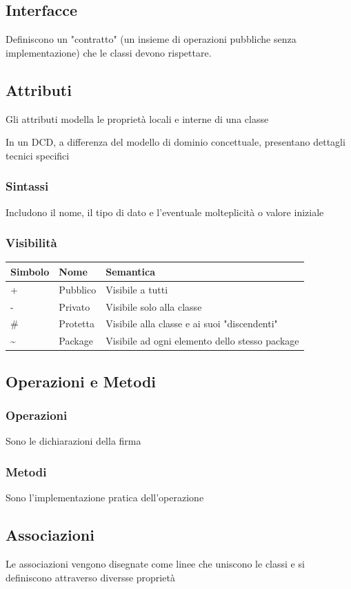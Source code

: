 \subsection{Interfacce}
Definiscono un "contratto" (un insieme di operazioni pubbliche senza implementazione) che le classi devono rispettare.
\subsection{Attributi}
Gli attributi modella le proprietà locali e interne di una classe

In un DCD, a differenza del modello di dominio concettuale, presentano dettagli tecnici specifici
\subsubsection{Sintassi}
Includono il nome, il tipo di dato e l'eventuale molteplicità o valore iniziale
\subsubsection{Visibilità}
\begin{tabularx}{\linewidth}{|X|X|X|}
\hline
\textbf{Simbolo} & \textbf{Nome} & \textbf{Semantica} \\ \hline
+ & Pubblico & Visibile a tutti \\ \hline
- & Privato & Visibile solo alla classe \\ \hline
\# & Protetta & Visibile alla classe e ai suoi "discendenti" \\ \hline
\textasciitilde & Package & Visibile ad ogni elemento dello stesso package \\ \hline
\end{tabularx}
\subsection{Operazioni e Metodi}
\subsubsection{Operazioni}
Sono le dichiarazioni della firma
\subsubsection{Metodi}
Sono l'implementazione pratica dell'operazione
\subsection{Associazioni}
Le associazioni vengono disegnate come linee che uniscono le classi e si definiscono attraverso diversse proprietà 
